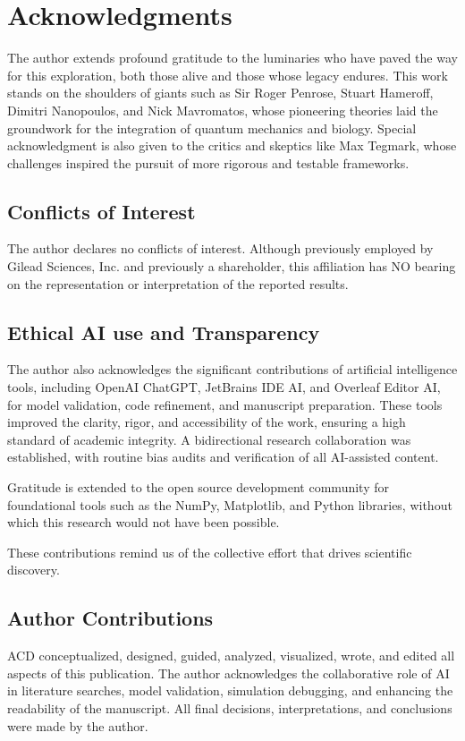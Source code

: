 \documentclass[entropy,article,submit,oneauthor,pdftex]{Definitions/mdpi}
\begin{document}
\section{Acknowledgments} 
The author extends profound gratitude to the luminaries who have paved the way for this exploration, both those alive and those whose legacy endures. This work stands on the shoulders of giants such as Sir Roger Penrose, Stuart Hameroff, Dimitri Nanopoulos, and Nick Mavromatos, whose pioneering theories laid the groundwork for the integration of quantum mechanics and biology. Special acknowledgment is also given to the critics and skeptics like Max Tegmark, whose challenges inspired the pursuit of more rigorous and testable frameworks. 

\subsection{Conflicts of Interest} 
The author declares no conflicts of interest. Although previously employed by Gilead Sciences, Inc. and previously a shareholder, this affiliation has NO bearing on the representation or interpretation of the reported results.  

\subsection{Ethical AI use and Transparency} 
The author also acknowledges the significant contributions of artificial intelligence tools, including OpenAI ChatGPT, JetBrains IDE AI, and Overleaf Editor AI, for model validation, code refinement, and manuscript preparation. These tools improved the clarity, rigor, and accessibility of the work, ensuring a high standard of academic integrity. A bidirectional research collaboration was established, with routine bias audits and verification of all AI-assisted content.

Gratitude is extended to the open source development community for foundational tools such as the NumPy, Matplotlib, and Python libraries, without which this research would not have been possible. 

These contributions remind us of the collective effort that drives scientific discovery. 

\subsection{Author Contributions} 
ACD conceptualized, designed, guided, analyzed, visualized, wrote, and edited all aspects of this publication. The author acknowledges the collaborative role of AI in literature searches, model validation, simulation debugging, and enhancing the readability of the manuscript. All final decisions, interpretations, and conclusions were made by the author. 
\end{document}
